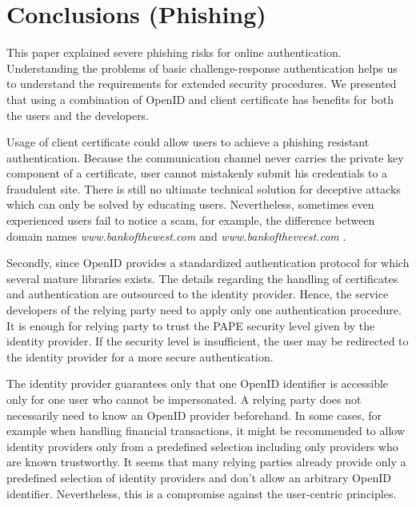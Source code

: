 \documentclass[english,gradu]{tktltiki}
\begin{document}
\section{Conclusions (Phishing)}

                 This paper explained severe phishing risks for online authentication. Understanding the problems of basic challenge-response authentication helps us to understand the requirements for extended security procedures. We presented that using a combination of OpenID and client certificate has benefits for both the users and the developers.

                 Usage of client certificate could allow users to achieve a phishing resistant authentication. Because the communication channel never carries the private key component of a certificate, user cannot mistakenly submit his credentials to a fraudulent site. There is still no ultimate technical solution for deceptive attacks which can only be solved by educating users. Nevertheless, sometimes even experienced users fail to notice a scam, for example, the difference between domain names
           \emph{www.bankofthewest.com} and \emph{www.bankofthevvest.com} \cite{why_phishing_works_06}.

                 Secondly, since OpenID provides a standardized authentication protocol for which several mature libraries exists. The details regarding the handling of certificates and authentication are outsourced to the identity provider. Hence, the service developers of the relying party need to apply only one authentication procedure. It is enough for relying party to trust the PAPE security level given by the identity provider. If the security level is insufficient, the user may be redirected to the identity provider for a more secure authentication.

                 The identity provider guarantees only that one OpenID identifier is accessible only for one user who cannot be impersonated. A relying party does not necessarily need to know an OpenID provider beforehand. In some cases, for example when handling financial transactions, it might be recommended to allow identity providers only from a predefined selection including only providers who are known trustworthy. It seems that many relying parties already provide only a predefined selection of identity providers and don't allow an arbitrary OpenID identifier. Nevertheless, this is a compromise against the user-centric principles.
\end{document}
